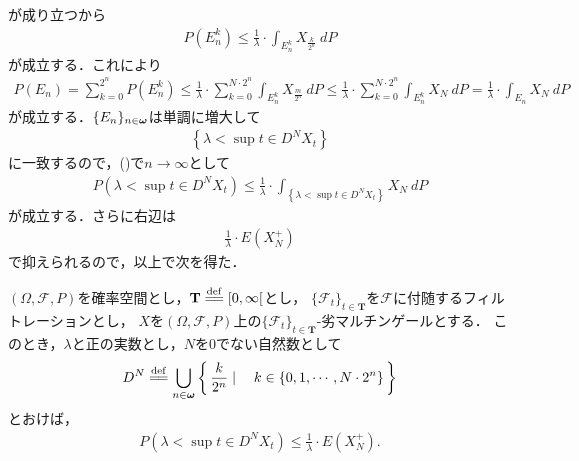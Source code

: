 	が成り立つから
	\begin{align}
		P(E_n^k) \leq \frac{1}{\lambda} \cdot \int_{E_n^k} X_{\frac{k}{2^n}}\ dP
	\end{align}
	が成立する．これにより
	\begin{align}
		P(E_n) = \sum_{k=0}^{2^n} P(E_n^k)
		\leq \frac{1}{\lambda} \cdot \sum_{k=0}^{N \cdot 2^n} \int_{E_n^k} X_{\frac{m}{2^n}}\ dP
		\leq \frac{1}{\lambda} \cdot \sum_{k=0}^{N \cdot 2^n} \int_{E_n^k} X_N\ dP
		= \frac{1}{\lambda} \cdot \int_{E_n} X_N\ dP
		\label{fom:Doob_upper_bound_inequality_1}
	\end{align}
	が成立する．$\{E_n\}_{n \in {\boldsymbol \omega}}$は単調に増大して
	\begin{align}
		\left\{\lambda < \sup{t \in D^N}{X_t}\right\}
	\end{align}
	に一致するので，()で$n \longrightarrow \infty$として
	\begin{align}
		P\left(\lambda < \sup{t \in D^N}{X_t}\right)
		\leq \frac{1}{\lambda} \cdot \int_{\left\{\lambda < \sup{t \in D^N}{X_t}\right\}} X_N\ dP
	\end{align}
	が成立する．さらに右辺は
	\begin{align}
		\frac{1}{\lambda} \cdot E\left(X_N^+\right)
	\end{align}
	で抑えられるので，以上で次を得た．
	
	\begin{screen}
		\begin{thm}[Doobの上限不等式]\label{thm:Doob_sup_bounded_inequality}
			$(\Omega,\mathscr{F},P)$を確率空間とし，$\mathbf{T} \defeq [0,\infty[$とし，
			$\{\mathscr{F}_t\}_{t \in \mathbf{T}}$を$\mathscr{F}$に付随するフィルトレーションとし，
			$X$を$(\Omega,\mathscr{F},P)$上の$\{\mathscr{F}_t\}_{t \in \mathbf{T}}$-劣マルチンゲールとする．
			このとき，$\lambda$と正の実数とし，$N$を$0$でない自然数として
			\begin{align}
				D^N \defeq \bigcup_{n \in \Natural} \Set{\frac{k}{2^n}}{k \in \{0,1,\cdots,N \cdot 2^n\}}
			\end{align}
			とおけば，
			\begin{align}
				P\left(\lambda < \sup{t \in D^N}{X_t}\right)
				\leq \frac{1}{\lambda} \cdot E\left(X_N^+\right).
			\end{align}
		\end{thm}
	\end{screen}
	
